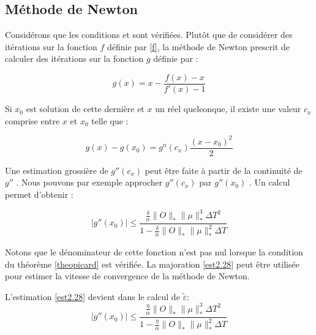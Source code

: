 \subsection{Méthode de Newton}
Considérons que les conditions \label{cond2.26} et \label{cond2.27} sont vérifiées. Plutôt que de considérer des itérations sur la fonction $f$ définie par \eqref{f}, la méthode de Newton prescrit de calculer des itérations sur la fonction $g$ définie par :

$$ g(x) = x -\frac{f(x) - x}{f'(x) - 1} $$

Si $x_0$ est solution de cette dernière et $x$ un réel quelconque, il existe une valeur $c_x$ comprise entre $x$ et $x_0$ telle que :

$$ g(x)-g(x_0) = g^n(c_x) \frac{(x-x_0)^2}{2} $$

Une estimation grossière de $g''(c_x)$ peut être faite à partir de la continuité de $g''$ . Nous pouvons par exemple approcher $g''(c_x)$  par $g''(x_0)$  . Un calcul permet d'obtenir :

\begin{equation} \label{est2.28}
|g''(x_0)| \leq \frac{\frac{\delta}{\alpha} \lVert O\rVert_* \lVert \mu \rVert _*^3 \Delta T^2 }{1-\frac{\delta}{\alpha} \lVert O\rVert_* \lVert \mu \rVert _*^2 \Delta T}
\end{equation}

Notons que le dénominateur de cette fonction n'est pas nul lorsque la condition du théorème \ref{theopicard} est vérifiée. La majoration \eqref{est2.28} peut être utilisée pour estimer la vitesse de convergence de la méthode de Newton.

L'estimation \eqref{est2.28} devient dans le calcul de $\tilde{\varepsilon}$:
\begin{equation} \label{est2.29}
|g''(x_0)| \leq \frac{\frac{\eta}{\alpha} \lVert O\rVert_* \lVert \mu \rVert _*^3 \Delta T^2 }{1-\frac{\eta}{\alpha} \lVert O\rVert_* \lVert \mu \rVert _*^2 \Delta T}
\end{equation}

